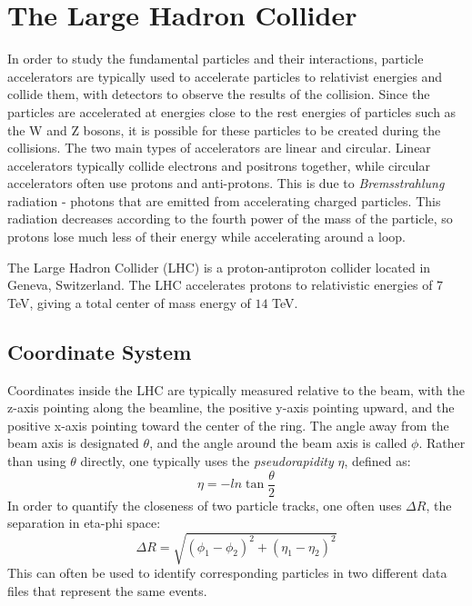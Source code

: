 \documentclass[10pt]{ucscthesisbs}
\begin{document}
\section{The Large Hadron Collider}
In order to study the fundamental particles and their interactions, particle accelerators are typically used to accelerate particles to relativist energies and collide them, with detectors to observe the results of the collision. Since the particles are accelerated at energies close to the rest energies of particles such as the W and Z bosons, it is possible for these particles to be created during the collisions. The two main types of accelerators are linear and circular. Linear accelerators typically collide electrons and positrons together, while circular accelerators often use protons and anti-protons. This is due to \textit{Bremsstrahlung} radiation - photons that are emitted from accelerating charged particles. This radiation decreases according to the fourth power of the mass of the particle, so protons lose much less of their energy while accelerating around a loop. \par
The Large Hadron Collider (LHC) is a proton-antiproton collider located in Geneva, Switzerland. The LHC accelerates protons to relativistic energies of $7$ TeV, giving a total center of mass energy of $14$ TeV. 
\subsection{Coordinate System}
Coordinates inside the LHC are typically measured relative to the beam, with the z-axis pointing along the beamline, the positive y-axis pointing upward, and the positive x-axis pointing toward the center of the ring. The angle away from the beam axis is designated $\theta$, and the angle around the beam axis is called $\phi$. Rather than using $\theta$ directly, one typically uses the \textit{pseudorapidity} $\eta$, defined as: \cite{LHC2008}
\begin{equation} \label{eq:eta}
\eta = -ln\tan{\frac{\theta}{2}}
\end{equation}
In order to quantify the closeness of two particle tracks, one often uses $\Delta R$, the separation in eta-phi space:
\begin{equation}
\Delta R = \sqrt{(\phi_1 - \phi_2)^2 + (\eta_1 - \eta_2)^2}
\end{equation}
This can often be used to identify corresponding particles in two different data files that represent the same events.
\end{document}
